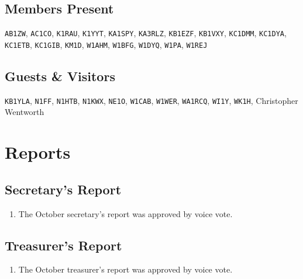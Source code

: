 \documentclass[10pt,letterpaper]{article}
\begin{document}
\subsection{Members Present}
\texttt{AB1ZW},
\texttt{AC1CO},
\texttt{K1RAU},
\texttt{K1YYT},
\texttt{KA1SPY},
\texttt{KA3RLZ},
\texttt{KB1EZF},
\texttt{KB1VXY},
\texttt{KC1DMM},
\texttt{KC1DYA},
\texttt{KC1ETB},
\texttt{KC1GIB},
\texttt{KM1D},
\texttt{W1AHM},
\texttt{W1BFG},
\texttt{W1DYQ},
\texttt{W1PA},
\texttt{W1REJ}

\subsection{Guests \& Visitors}
\texttt{KB1YLA},
\texttt{N1FF},
\texttt{N1HTB},
\texttt{N1KWX},
\texttt{NE1O},
\texttt{W1CAB},
\texttt{W1WER},
\texttt{WA1RCQ},
\texttt{WI1Y},
\texttt{WK1H},
Christopher Wentworth


\section{Reports}

\subsection{Secretary's Report}
\begin{enumerate}
  \item The October secretary's report was approved by voice vote.
\end{enumerate}

\newpage
\subsection{Treasurer's Report}
\begin{enumerate}
  \item The October treasurer's report was approved by voice vote.
\end{enumerate}
\end{document}
